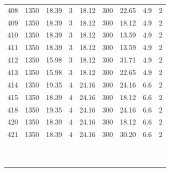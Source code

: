 \documentclass[11pt,twocolumn]{article}
\begin{document}
\begin{center}
\begin{tabular}{ccccccccc}
408    &       1350 &     18.39 &             3 &     18.12 &       300 &       22.65 &                4.9 &           2 \\
409    &       1350 &     18.39 &             3 &     18.12 &       300 &       18.12 &                4.9 &           2 \\
410    &       1350 &     18.39 &             3 &     18.12 &       300 &       13.59 &                4.9 &           2 \\
411    &       1350 &     18.39 &             3 &     18.12 &       300 &       13.59 &                4.9 &           2 \\
412    &       1350 &     15.98 &             3 &     18.12 &       300 &       31.71 &                4.9 &           2 \\
413    &       1350 &     15.98 &             3 &     18.12 &       300 &       22.65 &                4.9 &           2 \\
414    &       1350 &     19.35 &             4 &     24.16 &       300 &       24.16 &                6.6 &           2 \\
415    &       1350 &     18.39 &             4 &     24.16 &       300 &       18.12 &                6.6 &           2 \\
418    &       1350 &     19.35 &             4 &     24.16 &       300 &       24.16 &                6.6 &           2 \\
420    &       1350 &     18.39 &             4 &     24.16 &       300 &       18.12 &                6.6 &           2 \\
421    &       1350 &     18.39 &             4 &     24.16 &       300 &       30.20 &                6.6 &           2 \\
\bottomrule
{}	&	{}	&	{}	&	{}	&	{}	&	{}	&	{}	&	{}	&	{}	\\
{}	&	{}	&	{}	&	{}	&	{}	&	{}	&	{}	&	{}	&	{}	\\
{}	&	{}	&	{}	&	{}	&	{}	&	{}	&	{}	&	{}	&	{}	\\
{}	&	{}	&	{}	&	{}	&	{}	&	{}	&	{}	&	{}	&	{}	\\
{}	&	{}	&	{}	&	{}	&	{}	&	{}	&	{}	&	{}	&	{}	\\
{}	&	{}	&	{}	&	{}	&	{}	&	{}	&	{}	&	{}	&	{}	\\
{}	&	{}	&	{}	&	{}	&	{}	&	{}	&	{}	&	{}	&	{}	\\
{}	&	{}	&	{}	&	{}	&	{}	&	{}	&	{}	&	{}	&	{}	\\
{}	&	{}	&	{}	&	{}	&	{}	&	{}	&	{}	&	{}	&	{}	\\
{}	&	{}	&	{}	&	{}	&	{}	&	{}	&	{}	&	{}	&	{}	\\

\end{tabular}
\end{center}
\end{document}
